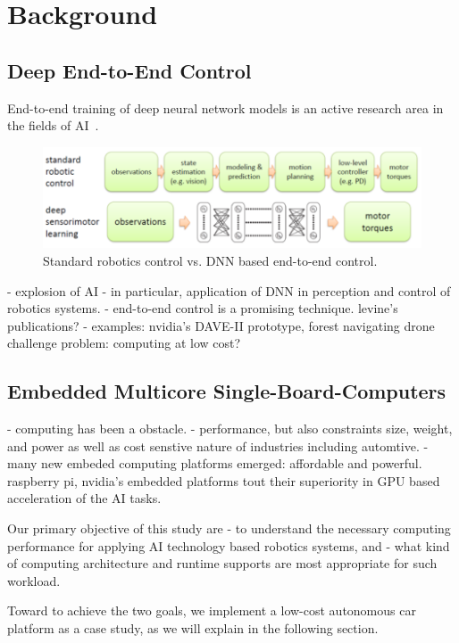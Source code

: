 \section{Background} \label{sec:background}

\subsection{Deep End-to-End Control}
End-to-end training of deep neural network models is an active
research area in the fields of AI~\cite{Levine2016}.

\begin{figure}[h]
  \centering
  \includegraphics[width=.5\textwidth]{figs/endtoend}
  \caption{Standard robotics control vs. DNN based end-to-end
    control. }
\end{figure}

- explosion of AI
- in particular, application of DNN in perception and control of robotics systems.
- end-to-end control is a promising technique.
  levine's publications?
- examples: nvidia's DAVE-II prototype, forest navigating drone
challenge problem: computing at low cost?


\subsection{Embedded Multicore Single-Board-Computers}

- computing has been a obstacle.
- performance, but also constraints size, weight, and power as well as
cost senstive nature of industries including automtive.
- many new embeded computing platforms emerged: affordable and
powerful. raspberry pi, nvidia's embedded platforms tout their
superiority in GPU based acceleration of the AI tasks.

Our primary objective of this study are
- to understand the necessary computing performance for applying AI
technology based robotics systems, and 
- what kind of computing architecture and runtime supports
are most appropriate for such workload.

Toward to achieve the two goals, we implement a low-cost autonomous
car platform as a case study, as we will explain in the following
section. 
